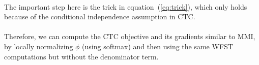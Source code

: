 \paragraph{} The important step here is the trick in equation~(\ref{eq:trick}), which only holds because of the conditional independence assumption in CTC.

\paragraph{} Therefore, we can compute the CTC objective and its gradients similar to MMI, by locally normalizing $\phi$ (using softmax) and then using the same WFST computations but without the denominator term.